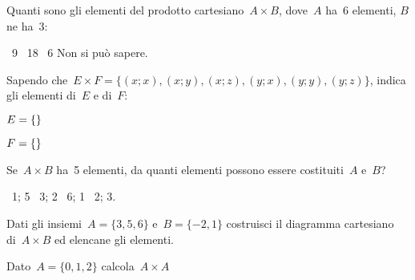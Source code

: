 \begin{esercizio}
 \label{ese:7.20}
Quanti sono gli elementi del prodotto cartesiano~$A\times B$, dove~$A$ ha~6 
elementi, $B$ ne ha~3:
\begin{center}
 \boxA\quad~9 \quad\boxB\quad~18 \quad\boxC\quad~6 \quad\boxD\quad Non si può 
sapere.
\end{center}
\end{esercizio}

\begin{esercizio}
 \label{ese:7.21}
Sapendo che~$E\times F=\{(x;x),(x;y),(x;z),(y;x),(y;y),(y;z)\}$, indica gli 
elementi di~$E$ e di~$F$:
\begin{multicols}{2}
\begin{enumeratea}
 \item $E=\{\dotfill \}$
 \item $F=\{\dotfill\}$
\end{enumeratea}
\end{multicols}
\end{esercizio}

\begin{esercizio}
 \label{ese:7.22}
Se~$A\times B$ ha~5 elementi, da quanti elementi possono essere costituiti~$A$ 
e~$B$?
\begin{center}
 \boxA\quad~1; 5 \quad\boxB\quad~3; 2 \quad\boxC\quad~6; 1 \quad\boxD\quad~2; 3.
\end{center}
\end{esercizio}

\begin{esercizio}
 \label{ese:7.23}
Dati gli insiemi~$A=\{3,5,6\}$ e~$B=\{-2,1\}$ costruisci il
diagramma cartesiano di~$A\times B$ ed elencane gli elementi.
\end{esercizio}

\begin{esercizio}
 \label{ese:7.24}
 Dato~$A=\{0,1,2\}$ calcola~$A\times A$
\end{esercizio}

\subsubsection*{}

